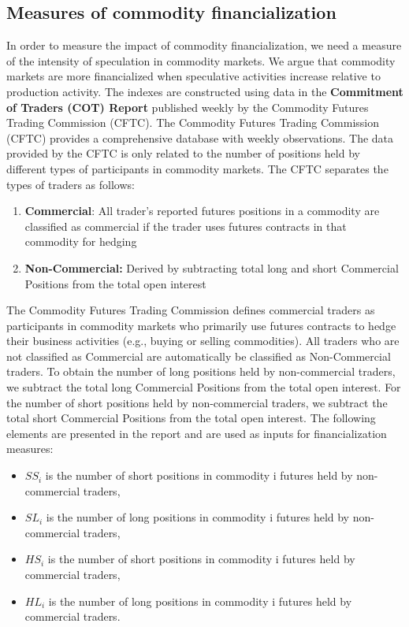 \documentclass[12pt]{article}
\begin{document}
\subsection{Measures of commodity financialization}
In order to measure the impact of commodity financialization, we need a measure of the intensity of speculation in commodity markets. We argue that commodity markets are more financialized when speculative activities increase relative to production activity. The indexes are constructed using data in the \textbf{Commitment of Traders (COT) Report} published weekly by the Commodity Futures Trading Commission (CFTC). The Commodity Futures Trading Commission (CFTC) provides a comprehensive database with weekly observations. The data provided by the CFTC is only related to the number of positions held by different types of participants in commodity markets. The CFTC separates the types of traders as follows:
\begin{enumerate}
\item \textbf{Commercial}: All trader’s reported futures positions in a commodity are classified as commercial if the trader uses futures contracts in that commodity for hedging
\item \textbf{Non-Commercial:} Derived by subtracting total long and short Commercial Positions from the total open interest
\end{enumerate}
The Commodity Futures Trading Commission defines commercial traders as participants in commodity markets who primarily use futures contracts to hedge their business activities (e.g., buying or selling commodities). All traders who are not classified as Commercial are automatically be classified as Non-Commercial traders. To obtain the number of long positions held by non-commercial traders, we subtract the total long Commercial Positions from the total open interest. For the number of short positions held by non-commercial traders, we subtract the total short Commercial Positions from the total open interest. The following elements are presented in the report and are used as inputs for financialization measures:
\begin{itemize}
\item $SS_i$ is the number of short positions in commodity i futures held by non-commercial traders,
\item $SL_i$  is the number of long positions in commodity i futures held by non-commercial traders,
\item $HS_i$ is the number of short positions in commodity i futures held by commercial traders, 
\item $HL_i$ is the number of long positions in commodity i futures held by commercial traders.
\end{itemize}
\end{document}
